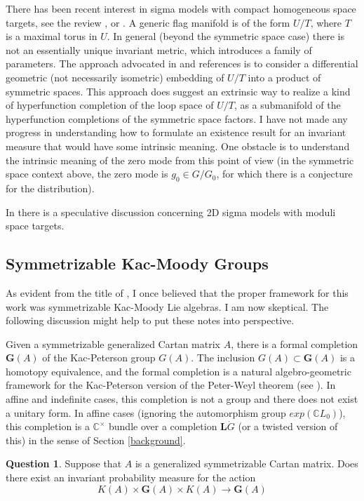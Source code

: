 \documentclass{amsart}
\theoremstyle{conjecture}
\theoremstyle{definition}
\theoremstyle{question}
\newtheorem{question}{Question}
\theoremstyle{questions}
\theoremstyle{remark}
\theoremstyle{remarks}
\theoremstyle{example}
\numberwithin{equation}{section}
\begin{document}
There has been recent interest in sigma models with compact homogeneous space targets, see the review \cite{ABK}, or \cite{OSS}. A generic flag manifold is of the form $U/T$, where $T$ is a maximal torus in $U$. In general (beyond the symmetric space case) there is not an essentially unique invariant metric, which introduces a family of parameters. The approach advocated in \cite{ABK} and references is to consider a differential geometric (not necessarily isometric) embedding of $U/T$ into a product of symmetric spaces.  This approach does suggest an extrinsic way to realize a kind of hyperfunction completion of the loop space of $U/T$, as a submanifold of the hyperfunction completions of the symmetric space factors. I have not made any progress in understanding how to formulate an existence result for an invariant measure that would have some intrinsic meaning. One obstacle is to understand the intrinsic meaning of the zero mode from this point of view (in the symmetric space context above, the zero mode is $g_0\in G/G_0$, for which there is a conjecture for the distribution).

In \cite{Witten} there is a speculative discussion concerning 2D sigma models with moduli space targets.


\subsection{Symmetrizable Kac-Moody Groups}\label{symmetrizable}

As evident from the title of \cite{Pi1}, I once believed that the proper framework for this work was
symmetrizable Kac-Moody Lie algebras. I am now skeptical. The following discussion might help to put these notes
into perspective.

Given a symmetrizable generalized Cartan matrix $A$, there is a formal completion $\mathbf{G}(A)$ of the Kac-Peterson group $G(A)$. The inclusion $G(A)\subset \mathbf{G}(A)$  is a homotopy equivalence, and the formal completion is a
natural algebro-geometric framework for the Kac-Peterson version of the Peter-Weyl theorem (see \cite{Pi1}). In affine and indefinite cases, this completion is not a group and there does not exist a unitary form. In affine cases (ignoring the automorphism group $exp(\mathbb C L_0)$), this completion is a $\mathbb C^{\times}$ bundle over a completion $\mathbf L \dot G$ (or a twisted version of this) in the sense of Section \ref{background}.

\begin{question} Suppose that $A$ is a generalized symmetrizable Cartan matrix.
Does there exist an invariant probability measure for the action
$$K(A)\times \mathbf{G}(A) \times K(A) \to\mathbf{G}(A) $$
\end{question}
\end{document}
